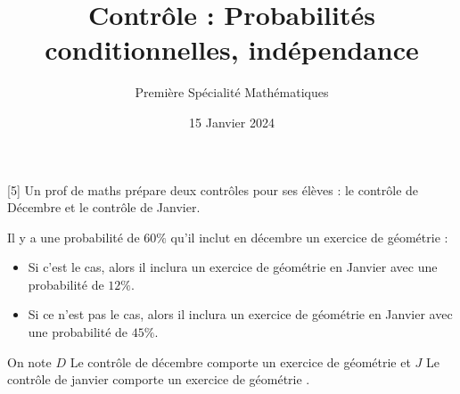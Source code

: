 \documentclass{exam}
\title{Contrôle : Probabilités conditionnelles, indépendance}
\author{Première Spécialité Mathématiques}
\date{15 Janvier 2024}
\begin{document}
\maketitle
\begin{questions}
[5]
Un prof de maths prépare deux contrôles pour ses élèves : le contrôle de Décembre et le contrôle de Janvier.

Il y a une probabilité de $60\%$ qu'il inclut en décembre un exercice de géométrie :
\begin{itemize}
\item Si c'est le cas, alors il inclura un exercice de géométrie en Janvier avec une probabilité de $12\%$.
\item Si ce n'est pas le cas, alors il inclura un exercice de géométrie en Janvier avec une probabilité de $45\%$.
\end{itemize}

On note $D$ \og Le contrôle de décembre comporte un exercice de géométrie \fg et $J$ \og Le contrôle de janvier comporte un exercice de géométrie \fg.

\vspace*{1cm}


\end{questions}
\end{document}
